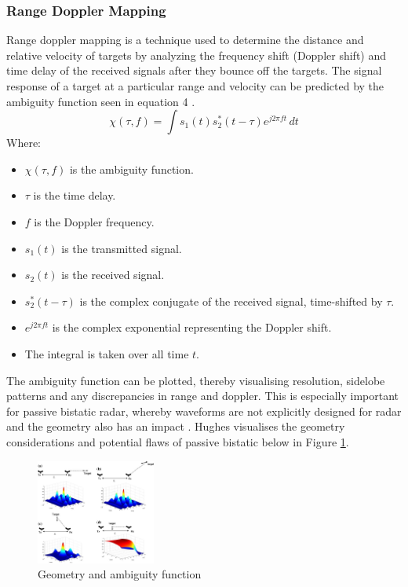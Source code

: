 \documentclass[12pt,a4paper]{article}
\begin{document}
\subsubsection{Range Doppler Mapping}
Range doppler mapping is a technique used to determine the distance and relative velocity of targets by analyzing the frequency shift (Doppler shift) and time delay of the received signals after they bounce off the targets. The signal response of a target at a particular range and velocity can be predicted by the ambiguity function seen in equation 4 \cite{INTRO2017}. 
\begin{equation}
    \chi(\tau, f) = \int s_1(t) s_2^*(t - \tau) e^{j2\pi f t} \, dt
\end{equation}
Where:
\begin{multicols}{2}
\begin{itemize}
\item \( \chi(\tau, f) \) is the ambiguity function.
\item \( \tau \) is the time delay.
\item \( f \) is the Doppler frequency.
\item \( s_1(t) \) is the transmitted signal.
\item \( s_2(t) \) is the received signal.
\item \( s_2^*(t - \tau) \) is the complex conjugate of the received signal, time-shifted by \( \tau \).
\item \( e^{j2\pi f t} \) is the complex exponential representing the Doppler shift.
\item The integral is taken over all time \( t \).
\end{itemize}
\end{multicols}
\noindent The ambiguity function can be plotted, thereby visualising resolution, sidelobe patterns and any discrepancies in range and doppler. This is especially important for passive bistatic radar, whereby waveforms are not explicitly designed for radar and the geometry also has an impact \cite{FundamentalsPassiveRadar}. Hughes visualises the geometry considerations and potential flaws of passive bistatic below in Figure \ref{fig:ambiguity}.
\begin{figure}[htbp]
    \centering
    \includegraphics[width=0.35\textwidth]{ambiguity.jpg}
    \caption{Geometry and ambiguity function \cite{FundamentalsPassiveRadar}}
    \label{fig:ambiguity}
\end{figure}
\end{document}

